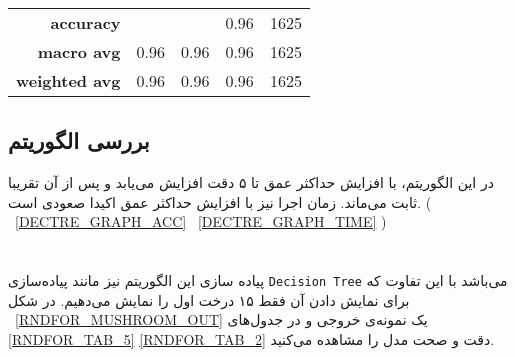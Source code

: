 \begin{latin}
\begin{table}[h!]
\begin{center}
\begin{tabular}{r|c|c|c|c}
    \textbf{accuracy} & & & 0.96 & 1625 \\
   \textbf{macro avg} & 0.96 & 0.96 & 0.96 & 1625 \\
\textbf{weighted avg} & 0.96 & 0.96 & 0.96 & 1625
    \end{tabular}
  \end{center}
\end{table}
\end{latin}



\subsection{بررسی الگوریتم}
در این الگوریتم، با افزایش حداکثر عمق تا ۵ دقت افزایش می‌یابد و پس از آن تقریبا ثابت می‌ماند.
زمان اجرا نیز با افزایش حداکثر عمق اکیدا صعودی است.
(  ~\cref{DECTRE_GRAPH_ACC}
~\cref{DECTRE_GRAPH_TIME}
)




\section{}
پیاده سازی این الگوریتم نیز مانند پیاده‌سازی
\verb;Decision Tree;
می‌باشد با این تفاوت که برای نمایش دادن آن فقط ۱۵ درخت اول را نمایش می‌دهیم.
در شکل
~\cref{RNDFOR_MUSHROOM_OUT}
یک نمونه‌ی خروجی و در جدول‌های
\cref{RNDFOR_TAB_5}
\cref{RNDFOR_TAB_2}
دقت و صحت مدل را مشاهده‌ می‌کنید.

